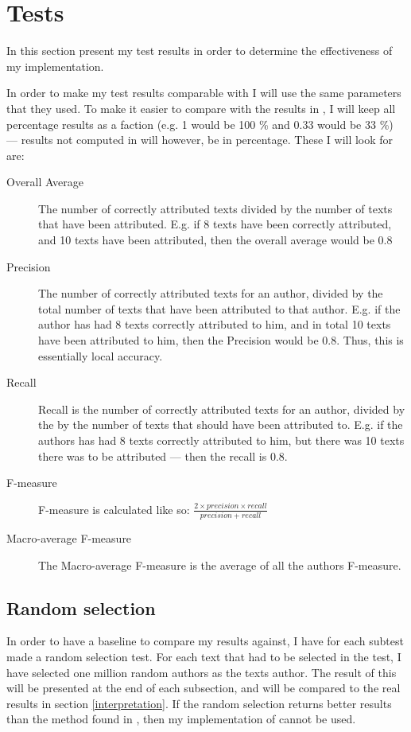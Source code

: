 \section{Tests}
\label{tests}

In this section present my test results in order to determine the effectiveness of my implementation.

In order to make my test results comparable with \cite{nr4} I will use the same parameters that they used. To make it easier to compare with the results in \cite{nr4}, I will keep all percentage results as a faction (e.g. 1 would be 100 \% and 0.33 would be 33 \%) --- results not computed in \cite{nr4} will however, be in percentage. These I will look for are: 

\begin{description}
\item[Overall Average] The number of correctly attributed texts divided by the number of texts that have been attributed. E.g. if 8 texts have been correctly attributed, and 10 texts have been attributed, then the overall average would be 0.8 

\item[Precision] The number of correctly attributed texts for an author, divided by the total number of texts that have been attributed to that author. E.g. if the author has had 8 texts correctly attributed to him, and in total 10 texts have been attributed to him, then the Precision would be 0.8. Thus, this is essentially local accuracy.

\item[Recall] Recall is the number of correctly attributed texts for an author, divided by the by the number of texts that should have been attributed to. E.g. if the authors has had 8 texts correctly attributed to him, but there was 10 texts there was to be attributed --- then the recall is 0.8.

\item[F-measure] F-measure is calculated like so: $\frac{2 \times precision \times recall}{precision+recall}$ 

\item[Macro-average F-measure] The Macro-average F-measure is the average of all the authors F-measure. 
\end{description}

\subsection{Random selection}
In order to have a baseline to compare my results against, I have for each subtest made a random selection test. For each text that had to be selected in the test, I have selected one million random authors as the texts author. The result of this will be presented at the end of each subsection, and will be compared to the real results in section \ref{interpretation}. If the random selection returns better results than the method found in \cite{nr4}, then my implementation of \cite{nr4} cannot be used. 

